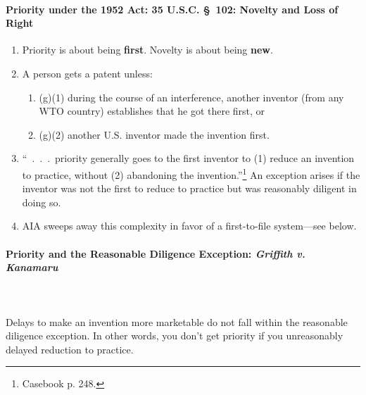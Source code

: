 \paragraph{Priority under the 1952 Act: 35 U.S.C. \S\ 102: Novelty and Loss of 
Right}

\begin{enumerate}
    \item Priority is about being \textbf{first}. Novelty is about being 
    \textbf{new}.
    \item A person gets a patent unless:
    \begin{enumerate}
        \item (g)(1) during the course of an interference, another inventor (from 
        any WTO country) establishes that he got there first, or
        \item (g)(2) another U.S. inventor made the invention first.
    \end{enumerate}
    \item ``~.~.~.~priority generally goes to the first inventor to (1) reduce 
    an invention to practice, without (2) abandoning the 
    invention.''\footnote{Casebook p. 248.} An exception arises if the inventor 
    was not the first to reduce to practice but was reasonably diligent in doing 
    so.
    \item AIA sweeps away this complexity in favor of a first-to-file 
    system---see below. 
\end{enumerate}

\paragraph{Priority and the Reasonable Diligence Exception: \emph{Griffith v. 
Kanamaru}}
~\\\\
Delays to make an invention more marketable do not fall within the reasonable 
diligence exception. In other words, you don't get priority if you 
unreasonably delayed reduction to practice.

